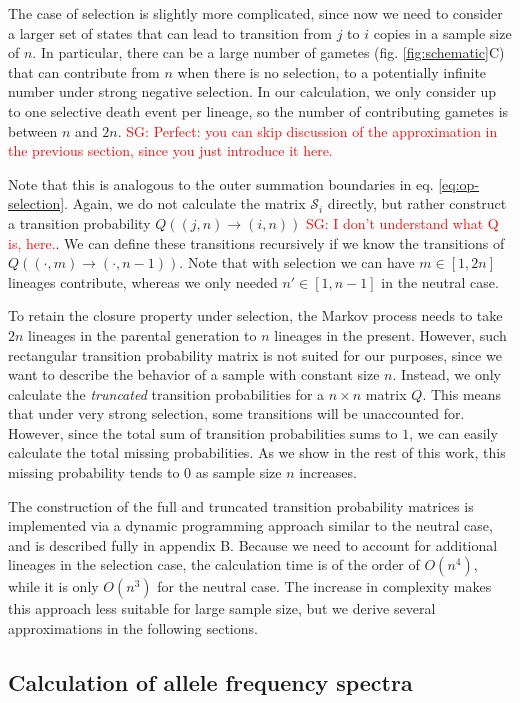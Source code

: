 \documentclass[review]{elsarticle}
\newcommand{\ra}{\rightarrow}
\newcommand{\sgcomment}[1]{\textcolor{red}{SG: #1}}
\begin{document}
The case of selection is slightly more complicated, since now we need to consider a larger set of
states that can lead to transition from $j$ to $i$ copies in a sample size of $n$. In particular,
there can be a large number of gametes (fig. \ref{fig:schematic}C) that can contribute from $n$ when
there is no selection, to a potentially infinite number under strong negative selection. In our
calculation, we only consider up to one selective death event per lineage, so the number of
contributing gametes is between $n$ and $2n$. \sgcomment{Perfect: you can skip discussion of the approximation in the previous section, since you just introduce it here. }

Note that this is analogous to the outer summation boundaries in eq. \eqref{eq:op-selection}. Again,
we do not calculate the matrix $\mathcal{S}_i$ directly, but rather construct a transition
probability $Q((j,n)\ra(i,n))$ \sgcomment{I don't understand what Q is, here.}. We can define these transitions recursively if we know the
transitions of $Q((\cdot,m)\ra(\cdot,n-1))$. Note that with selection we can have $m \in [1, 2n]$
lineages contribute, whereas we only needed $n' \in [1, n-1]$ in the neutral case.

To retain the closure property under selection, the Markov process needs to take $2n$ lineages in
the parental generation to $n$ lineages in the present. However, such rectangular transition
probability matrix is not suited for our purposes, since we want to describe the behavior of a
sample with constant size $n$. Instead, we only calculate the \textit{truncated} transition
probabilities for a $n \times n$ matrix $Q$. This means that under very strong selection, some
transitions will be unaccounted for. However, since the total sum of transition probabilities sums
to $1$, we can easily calculate the total missing probabilities. As we show in the rest of this
work, this missing probability tends to $0$ as sample size $n$ increases.

The construction of the full and truncated transition probability matrices is implemented via a
dynamic programming approach similar to the neutral case, and is described fully in
appendix B. Because we need to account for additional lineages in the selection case, the
calculation time is of the order of $O(n^4)$, while it is only $O(n^3)$ for the neutral case. The
increase in complexity makes this approach less suitable for large sample size, but we derive
several approximations in the following sections.

\subsection{Calculation of allele frequency spectra}
\label{subsec:afs}
\end{document}
